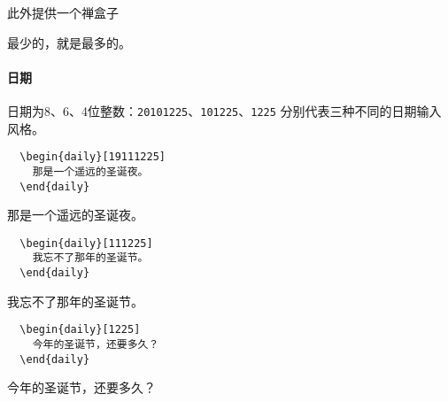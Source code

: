 \documentclass{SYSUDaily}
\begin{document}
此外提供一个禅盒子
\begin{daily}[empty]
	最少的，就是最多的。
\end{daily}
\paragraph{日期}
日期为8、6、4位整数：\verb|20101225|、\verb|101225|、\verb|1225| 分别代表三种不同的日期输入风格。

\begin{multicols}{2}
	\begin{lstlisting}
  \begin{daily}[19111225]
    那是一个遥远的圣诞夜。
  \end{daily}
  \end{lstlisting}
	\small
	\begin{daily}[19111225]
		那是一个遥远的圣诞夜。
	\end{daily}
\end{multicols}


\begin{multicols}{2}
	\begin{lstlisting}
  \begin{daily}[111225]
    我忘不了那年的圣诞节。
  \end{daily}
  \end{lstlisting}
	\small
	\begin{daily}[111225]
		我忘不了那年的圣诞节。
	\end{daily}
\end{multicols}


\begin{multicols}{2}
	\begin{lstlisting}
  \begin{daily}[1225]
    今年的圣诞节，还要多久？
  \end{daily}
  \end{lstlisting}
	\small
	\begin{daily}[1225]
		今年的圣诞节，还要多久？
	\end{daily}
\end{multicols}
\end{document}
